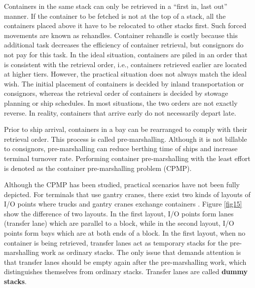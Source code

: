 \documentclass[review,3p,times,authoryear,12pt]{elsarticle}
\begin{document}
Containers in the same stack can only be retrieved in a ``first in, last out'' manner. 
If the container to be fetched is not at the top of a stack, all the containers placed above it have to be relocated to other stacks first. 
Such forced movements are known as rehandles. 
Container rehandle is costly because this additional task decreases the efficiency of container retrieval, but consignors do not pay for this task. 
In the ideal situation, containers are piled in an order that is consistent with the retrieval order, i.e., containers retrieved earlier are located at higher tiers. 
However, the practical situation does not always match the ideal wish. 
The initial placement of containers is decided by inland transportation or consignors, whereas the retrieval order of containers is decided by stowage planning or ship schedules. In most situations, the two orders are not exactly reverse. In reality, containers that arrive early do not necessarily depart late.

Prior to ship arrival, containers in a bay can be rearranged to comply with their retrieval order. 
This process is called pre-marshalling. 
Although it is not billable to consignors, pre-marshalling can reduce berthing time of ships and increase terminal turnover rate. 
Performing container pre-marshalling with the least effort is denoted as the container pre-marshalling problem (CPMP).

Although the CPMP has been studied, practical scenarios have not been fully depicted. 
For terminals that use gantry cranes, there exist two kinds of layouts of I/O points where trucks and gantry cranes exchange containers \citep{Carlo2014}. 
Figure \ref{fig15} show the difference of two layouts. 
In the first layout, I/O points form lanes (transfer lane) which are parallel to a block, while in the second layout, I/O points form bays which are at both ends of a block. 
In the first layout, when no container is being retrieved, transfer lanes act as temporary stacks for the pre-marshalling work as ordinary stacks. 
The only issue that demands attention is that transfer lanes should be empty again after the pre-marshalling work, which distinguishes themselves from ordinary stacks. 
Transfer lanes are called \textbf{dummy stacks}.
\end{document}

